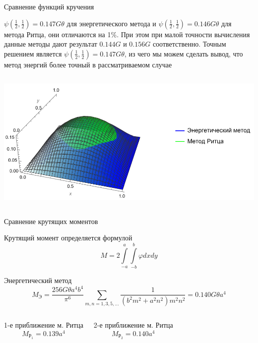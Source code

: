 \documentclass[ignoreonframetext,unicode]{beamer}
\begin{document}
\begin{frame}{Сравнение функций кручения}


\begin{block}{}
	$\psi\left(\frac{1}{2}, \frac{1}{2}\right) = 0.147G\theta$ для энергетического метода и $\psi\left(\frac{1}{2}, \frac{1}{2}\right) = 0.146G\theta$ для метода Ритца, они отличаются на 1\%. При этом при малой точности вычисления данные методы дают результат $0.144G$ и $0.156G$ соответственно. Точным решением является $\psi\left(\frac{1}{2}, \frac{1}{2}\right) = 0.147G\theta$, из чего мы можем сделать вывод, что метод энергий более точный в рассматриваемом случае
\end{block}

\begin{columns}
	\includegraphics[width=1\textwidth]{compare3d}
\end{columns}
	

\end{frame}

\begin{frame}{Сравнение крутящих моментов}
	
	\begin{block}{Крутящий момент определяется формулой}	
	\[
	M = 2 \int\limits_{-a}^a \int\limits_{-b}^b \varphi dx dy
	\]
	\end{block}	
	
	\begin{block}{Энергетический метод}	
\[
	M_{\text{Э}} = \frac{256 G \theta a^4 b^4} {\pi^6}\!\!\!\sum_{m, n = 1, 3, 5, \ldots}\!\!\!\frac{1}{(b^2 m^2 + a^2 n^2 )m^2 n^2}
	= 0.140G\theta a^4
\]
	\end{block}
\begin{columns}
\begin{block}{1-е приближение м. Ритца}
\[
M_{\text{Р}_1} = 0.139a^4
\]
\end{block}
\begin{block}{2-е приближение м. Ритца}
\[
M_{\text{Р}_2} = 0.140a^4
\]
\end{block}
\end{columns}

\end{frame}
\end{document}
